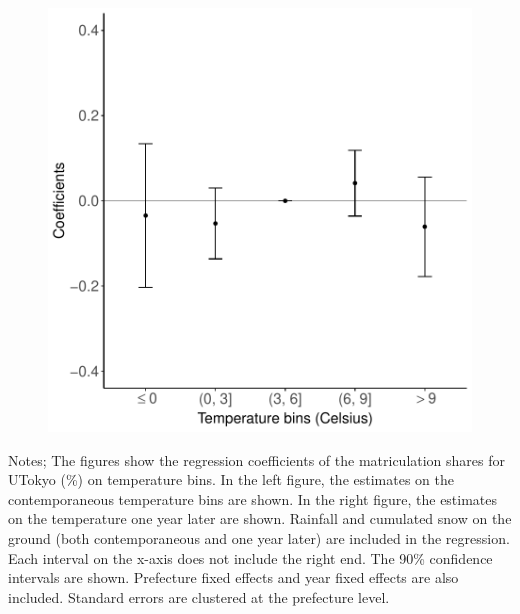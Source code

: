 \documentclass[9pt, pdfmx,hiresbb]{beamer}
\begin{document}
\begin{frame}
\begin{minipage}{0.49\textwidth}
\begin{figure}[h]
      \includegraphics[width = \textwidth]{../Output/images/reg_placebo_f1_4.pdf}
      \centering
    \end{figure}
  \end{minipage}
  \tiny
  \begin{tablenotes}
  \item Notes;
    The figures show the regression coefficients of the matriculation shares for UTokyo (\%) on temperature bins.
    In the left figure, the estimates on the contemporaneous temperature bins are shown.
    In the right figure, the estimates on the temperature one year later are shown.
    Rainfall and cumulated snow on the ground (both contemporaneous and one year later) are included in the regression.
    Each interval on the x-axis does not include the right end.
    The 90\% confidence intervals are shown.
    Prefecture fixed effects and year fixed effects are also included.
    Standard errors are clustered at the prefecture level.
  \end{tablenotes}
\end{frame}
\end{document}
